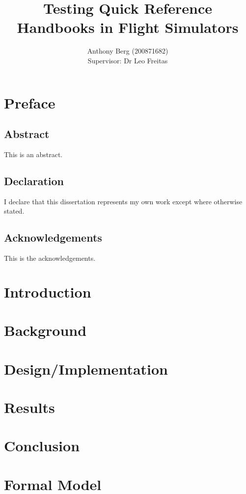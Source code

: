 \documentclass[british, twoside]{report}
\author{Anthony Berg (200871682)\\
Supervisor: Dr Leo Freitas}
\title{Testing Quick Reference Handbooks in Flight Simulators}
\begin{document}
\maketitle

\chapter*{Preface}
\section*{Abstract}
This is an abstract.

\section*{Declaration}
I declare that this dissertation represents my own work except where otherwise stated.

\section*{Acknowledgements}
This is the acknowledgements.

\tableofcontents

\chapter{Introduction}


\chapter{Background}


\chapter{Design/Implementation}


\chapter{Results}


\chapter{Conclusion}


\appendix
\chapter{Formal Model}


\nocite{*}
\printbibliography[heading=bibintoc, title={References}]
\end{document}
